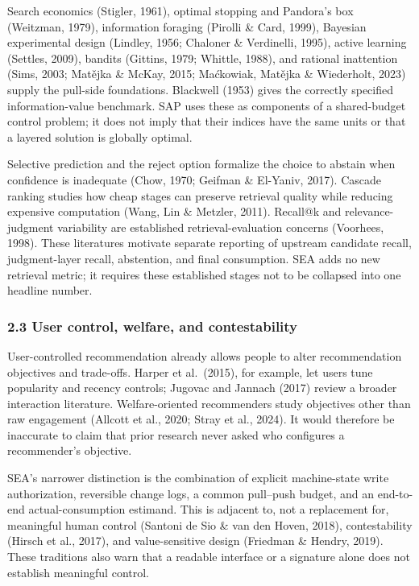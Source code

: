 \documentclass[
  11pt]{article}
\begin{document}
Search economics (Stigler, 1961), optimal stopping and Pandora's box
(Weitzman, 1979), information foraging (Pirolli \& Card, 1999), Bayesian
experimental design (Lindley, 1956; Chaloner \& Verdinelli, 1995),
active learning (Settles, 2009), bandits (Gittins, 1979; Whittle, 1988),
and rational inattention (Sims, 2003; Matějka \& McKay, 2015; Maćkowiak,
Matějka \& Wiederholt, 2023) supply the pull-side foundations. Blackwell
(1953) gives the correctly specified information-value benchmark. SAP
uses these as components of a shared-budget control problem; it does not
imply that their indices have the same units or that a layered solution
is globally optimal.

Selective prediction and the reject option formalize the choice to
abstain when confidence is inadequate (Chow, 1970; Geifman \& El-Yaniv,
2017). Cascade ranking studies how cheap stages can preserve retrieval
quality while reducing expensive computation (Wang, Lin \& Metzler,
2011). Recall@k and relevance-judgment variability are established
retrieval-evaluation concerns (Voorhees, 1998). These literatures
motivate separate reporting of upstream candidate recall, judgment-layer
recall, abstention, and final consumption. SEA adds no new retrieval
metric; it requires these established stages not to be collapsed into
one headline number.

\subsubsection{2.3 User control, welfare, and
contestability}\label{user-control-welfare-and-contestability}

User-controlled recommendation already allows people to alter
recommendation objectives and trade-offs. Harper et al.~(2015), for
example, let users tune popularity and recency controls; Jugovac and
Jannach (2017) review a broader interaction literature. Welfare-oriented
recommenders study objectives other than raw engagement (Allcott et al.,
2020; Stray et al., 2024). It would therefore be inaccurate to claim
that prior research never asked who configures a recommender's
objective.

SEA's narrower distinction is the combination of explicit machine-state
write authorization, reversible change logs, a common pull--push budget,
and an end-to-end actual-consumption estimand. This is adjacent to, not
a replacement for, meaningful human control (Santoni de Sio \& van den
Hoven, 2018), contestability (Hirsch et al., 2017), and value-sensitive
design (Friedman \& Hendry, 2019). These traditions also warn that a
readable interface or a signature alone does not establish meaningful
control.
\end{document}
